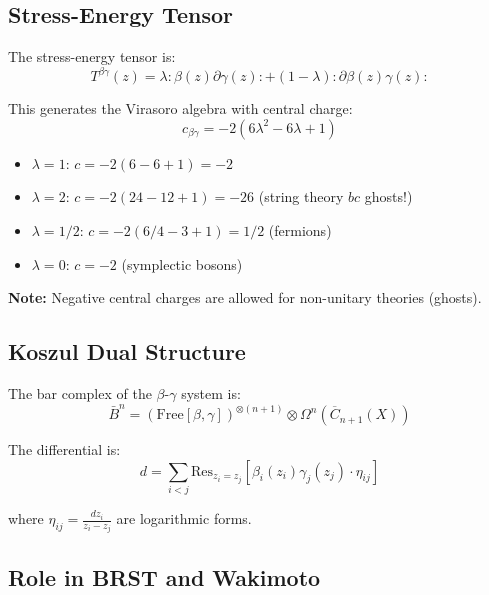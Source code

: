 \subsection{Stress-Energy Tensor}

\begin{theorem}
\label{thm:beta-gamma-stress}
The stress-energy tensor is:
$$T^{\beta\gamma}(z) = \lambda :\beta(z)\partial\gamma(z): + (1-\lambda):\partial\beta(z)\gamma(z):$$

This generates the Virasoro algebra with central charge:
$$c_{\beta\gamma} = -2(6\lambda^2 - 6\lambda + 1)$$
\end{theorem}

\begin{computation}
\label{comp:beta-gamma-central-charges}
\begin{itemize}
\item $\lambda = 1$: $c = -2(6-6+1) = -2$ 
\item $\lambda = 2$: $c = -2(24-12+1) = -26$ (string theory $bc$ ghosts!)
\item $\lambda = 1/2$: $c = -2(6/4 - 3 + 1) = 1/2$ (fermions)
\item $\lambda = 0$: $c = -2$ (symplectic bosons)
\end{itemize}

\textbf{Note:} Negative central charges are allowed for non-unitary theories (ghosts).
\end{computation}

\subsection{Koszul Dual Structure}

\begin{theorem}
\label{thm:beta-gamma-bar}
The bar complex of the $\beta$-$\gamma$ system is:
$$\bar{B}^n = \left(\text{Free}[\beta, \gamma]\right)^{\otimes (n+1)} \otimes \Omega^n(\overline{C}_{n+1}(X))$$

The differential is:
$$d = \sum_{i<j} \text{Res}_{z_i=z_j}\left[\beta_i(z_i)\gamma_j(z_j) \cdot \eta_{ij}\right]$$

where $\eta_{ij} = \frac{dz_i}{z_i-z_j}$ are logarithmic forms.
\end{theorem}

\subsection{Role in BRST and Wakimoto}

